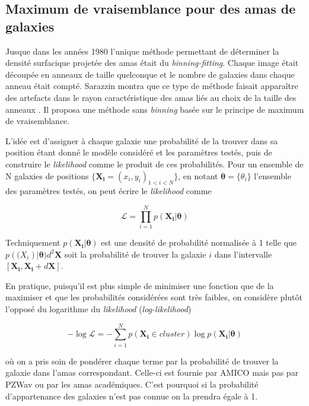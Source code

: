 \documentclass[a4paper,11pt]{article}
\numberwithin{equation}{section}
\begin{document}
  \label{sec:Likelihood}
  \subsection{Maximum de vraisemblance pour des amas de galaxies}
    Jusque dans les années 1980 l'unique méthode permettant de déterminer la densité surfacique projetée des amas était du \textit{binning-fitting}. Chaque image était découpée en anneaux de taille quelconque et le nombre de galaxies dans chaque anneau était compté. Sarazzin montra que ce type de méthode faisait apparaître des artefacts dans le rayon caractéristique des amas liés au choix de la taille des anneaux \cite{Sarazin1980}. Il proposa une méthode sans \textit{binning} basée sur le principe de maximum de vraisemblance.\par
    L'idée est d'assigner à chaque galaxie une probabilité de la trouver dans sa position étant donné le modèle considéré et les paramètres testés, puis de construire le \textit{likelihood} comme le produit de ces probabilités. Pour un ensemble de N galaxies de positions $ \lbrace \bm{X_i} = (x_i , y_i )_{1 < i < N} \rbrace $, en notant $\bm{\theta} = \lbrace \theta_i \rbrace $ l'ensemble des paramètres testés, on peut écrire le \textit{likelihood} comme
    
    \begin{equation}
      \label{eq:Likelihood}
      \mathscr{L} = \prod_{i=1}^N p( \bm{X_i} | \bm{\theta})
    \end{equation}
    
    Techniquement $p(\bm{X_i} | \bm{\theta})$ est une densité de probabilité normalisée à 1 telle que $p(\bm(X_i) | \bm \theta) d^2\bm{X}$ soit la probabilité de trouver la galaxie $i$ dans l'intervalle $[\bm{X_i} , \bm{X_i} + d\bm{X} ]$.\par 
    En pratique, puisqu'il est plus simple de minimiser une fonction que de la maximiser et que les probabilités considérées sont très faibles, on considère plutôt l'opposé du logarithme du \textit{likelihood} (\textit{log-likelihood})
    
    \begin{equation}
      \label{eq:Log_Likelihood}
      - \log \mathscr{L} = - \sum_{i=1}^N p (\bm{X_i} \in cluster) \log p (\bm{X_i} | \bm{\theta})
    \end{equation}
    
    où on a pris soin de pondérer chaque terme par la probabilité de trouver la galaxie dans l'amas correspondant. Celle-ci est fournie par AMICO mais pas par PZWav ou par les amas académiques. C'est pourquoi si la probabilité d'appartenance des galaxies n'est pas connue on la prendra  égale à 1.
    
\end{document}
